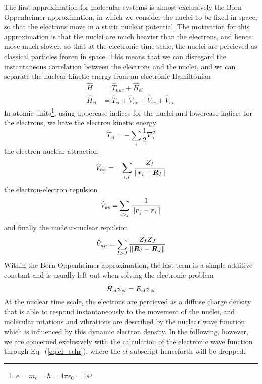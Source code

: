 The first approximation for molecular systems is almost exclusively the Born-Oppenheimer 
approximation\cite{BornOppenheimer},
in which we consider the nuclei to be fixed in space, so that the electrons move in a static
nuclear potential. The motivation for this approximation is that the nuclei are much heavier
than the electrons, and hence move much slower, so that at the electronic time scale, the
nuclei are percieved as classical particles frozen in space. This means that we can disregard the
instantaneous correlation between the electrons and the nuclei, and we can separate the nuclear
kinetic energy from an electronic Hamiltonian
\begin{align}
    \hat{H} &= \hat{T}_{nuc} + \hat{H}_{el}\\
    \hat{H}_{el} &= \hat{T}_{el} + \hat{V}_{ne} + \hat{V}_{ee} + \hat{V}_{nn}
\end{align}
In atomic units\footnote{$e=m_e=\hbar=4\pi\epsilon_0=1$}, using uppercase indices for the
nuclei and lowercase indices for the electrons, we have the electron kinetic energy
\begin{equation}
    \hat{T}_{el} = -\sum_i \frac{1}{2}\nabla_i^2
\end{equation}
the electron-nuclear attraction
\begin{equation}
    \hat{V}_{ne} = -\sum_{i,I} \frac{Z_I}{\|\boldsymbol r_i-\boldsymbol R_I\|}
\end{equation}
the electron-electron repulsion
\begin{equation}
    \hat{V}_{ee} = \sum_{i>j} \frac{1}{\|\boldsymbol r_j-\boldsymbol r_i\|}
\end{equation}
and finally the nuclear-nuclear repulsion
\begin{equation}
    \hat{V}_{nn} = \sum_{I>J} \frac{Z_IZ_J}{\|\boldsymbol R_I-\boldsymbol R_J\|}
\end{equation}
Within the Born-Oppenheimer approximation, the last term is a simple additive constant 
and is usually left out when solving the electronic problem
\begin{equation}
    \label{eq:el_schr}
    \hat{H}_{el}\psi_{el} = E_{el}\psi_{el}
\end{equation}
At the nuclear time scale, the electrons are percieved as a diffuse charge density that is
able to respond instantaneously to the movement of the nuclei, and molecular rotations and 
vibrations are described by the nuclear wave function which is influenced by this dynamic
electron density. In the following, however, we are concerned exclusively with the calculation 
of the electronic wave function through Eq.~(\ref{eq:el_schr}), where the $el$ subscript 
henceforth will be dropped.

